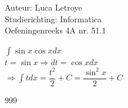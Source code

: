 \documentclass[a4paper]{article}
\newcommand{\dint}{\displaystyle\int}
\begin{document}
  
\noindent \large Auteur: Luca Letroye \\
\noindent \large Studierichting: Informatica\\
\noindent \large Oefeningenreeks 4A nr. 51.1

\medskip
\normalsize

$\dint \sin x \cos x dx $\\

$t = \sin x \Rightarrow dt = \cos x dx $\\

$\Rightarrow \dint t dx = \dfrac{t^2}{2}+C = \dfrac{\sin^2 x}{2} +C$\\




\begin{thebibliography}{999}
\end{thebibliography}
\end{document}
